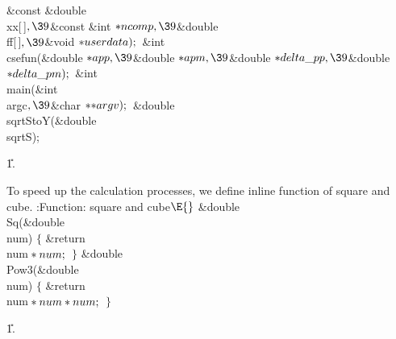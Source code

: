 \documentclass{cweb}
\begin{document}
\&{const} \&{double} \\{xx}[\,]${},\39{}$\&{const} \&{int} ${}{*}\\{ncomp},%
\39{}$\&{double} \\{ff}[\,]${},\39{}$\&{void} ${}{*}\\{userdata});{}$\6
\&{int} \\{csefun}(\&{double} ${}{*}\\{app},\39{}$\&{double} ${}{*}\\{apm},%
\39{}$\&{double} ${}{*}\\{delta\_pp},\39{}$\&{double} ${}{*}\\{delta\_pm});{}$\6
\&{int} \\{main}(\&{int} \\{argc}${},\39{}$\&{char} ${}{*}{*}\\{argv});{}$\6
\&{double} \\{sqrtStoY}(\&{double} \\{sqrtS});\par
\U1.\fi

To speed up the calculation processes, we define inline function of square
and cube.
\Y\B\4:Function: square and cube\X${}\E{}$\6
\&{double} \\{Sq}(\&{double} \\{num})\1\1\2\2\6
${}\{{}$\1\6
\&{return} \\{num}${}*\\{num};{}$\6
\4${}\}{}$\2\7
\&{double} \\{Pow3}(\&{double} \\{num})\1\1\2\2\6
${}\{{}$\1\6
\&{return} \\{num}${}*\\{num}*\\{num};{}$\6
\4${}\}{}$\2\par
\U1.\fi
\end{document}
